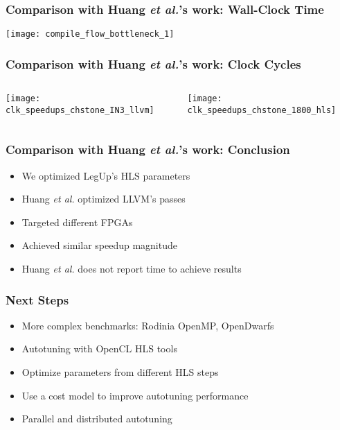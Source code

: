 \documentclass[10pt, compress, aspectratio=169]{beamer}
\begin{document}
\begin{frame}
    \frametitle{Comparison with Huang \textit{et al.}'s work: Wall-Clock Time}
    \begin{center}
        \texttt{[image: compile\_flow\_bottleneck\_1]}
    \end{center}
\end{frame}

\begin{frame}
    \frametitle{Comparison with Huang \textit{et al.}'s work: Clock Cycles}
    \begin{columns}[T]
        \begin{center}
            \texttt{[image: clk\_speedups\_chstone\_IN3\_llvm]}
        \end{center}
        \begin{center}
            \texttt{[image: clk\_speedups\_chstone\_1800\_hls]}
        \end{center}
    \end{columns}
\end{frame}

\begin{frame}
    \frametitle{Comparison with Huang \textit{et al.}'s work: Conclusion}
    \begin{itemize}
        \item We optimized \alert{LegUp's HLS parameters}
        \item Huang \textit{et al.} optimized \alert{LLVM's passes}
        \item Targeted \alert{different FPGAs}
        \item Achieved similar speedup magnitude
        \item Huang \textit{et al.} does not report time to achieve results
    \end{itemize}
\end{frame}

\begin{frame}
    \frametitle{Next Steps}
    \begin{itemize}
        \item More \alert{complex benchmarks}: Rodinia OpenMP, OpenDwarfs
        \item Autotuning with \alert{OpenCL HLS} tools
        \item Optimize parameters from \alert{different HLS steps}
        \item Use a \alert{cost model} to improve autotuning performance
        \item \alert{Parallel and distributed} autotuning
    \end{itemize}
\end{frame}
\end{document}
